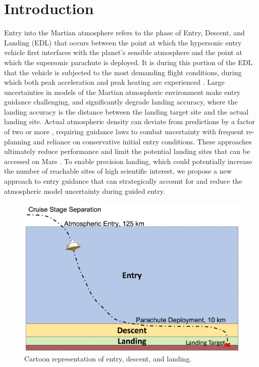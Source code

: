 \section{Introduction}
Entry into the Martian atmosphere refers to the phase of Entry, Descent, and Landing (EDL) that occurs between the point at which the hypersonic entry vehicle first interfaces with the planet’s sensible atmosphere and the point at which the supersonic parachute is deployed. It is during this portion of the EDL that the vehicle is subjected to the most demanding flight conditions, during which both peak acceleration and peak heating are experienced \cite{way2007}. Large uncertainties in models of the Martian atmospheric environment make entry guidance challenging, and significantly degrade landing accuracy, where the landing accuracy is the distance between the landing target site and the actual landing site. Actual atmospheric density can deviate from predictions by a factor of two or more \cite{justh2013}, requiring guidance laws to combat uncertainty with frequent re-planning and reliance on conservative initial entry conditions. These approaches ultimately reduce performance and limit the potential landing sites that can be accessed on Mars \cite{li2014}. To enable precision landing, which could potentially increase the number of reachable sites of high scientific interest, we propose a new approach to entry guidance that can strategically account for and reduce the atmospheric model uncertainty during guided entry.
\begin{figure}[h!]
\centering
\includegraphics[width=0.5\linewidth]{entry.png}
  \caption{Cartoon representation of entry, descent, and landing.}
  \label{fig:entry}
\end{figure}

